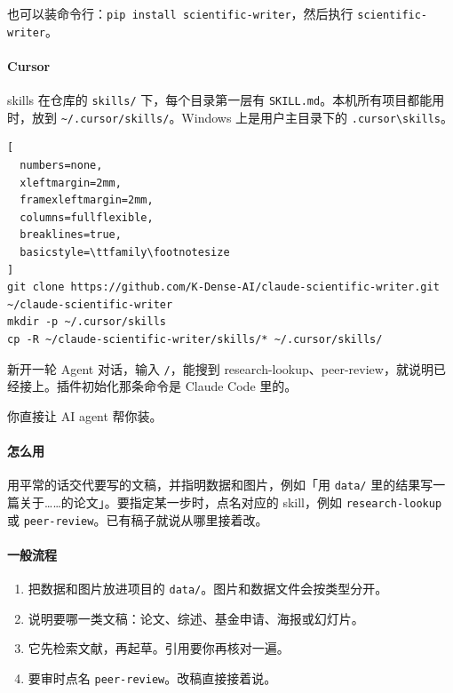 也可以装命令行：\verb|pip install scientific-writer|，然后执行 \verb|scientific-writer|。

\paragraph{Cursor}
skills 在仓库的 \verb|skills/| 下，每个目录第一层有 \verb|SKILL.md|。本机所有项目都能用时，放到 \verb|~/.cursor/skills/|。Windows 上是用户主目录下的 \verb|.cursor\skills|。
\begin{lstlisting}[
  numbers=none,
  xleftmargin=2mm,
  framexleftmargin=2mm,
  columns=fullflexible,
  breaklines=true,
  basicstyle=\ttfamily\footnotesize
]
git clone https://github.com/K-Dense-AI/claude-scientific-writer.git ~/claude-scientific-writer
mkdir -p ~/.cursor/skills
cp -R ~/claude-scientific-writer/skills/* ~/.cursor/skills/
\end{lstlisting}
新开一轮 Agent 对话，输入 \verb|/|，能搜到 research-lookup、peer-review，就说明已经接上。插件初始化那条命令是 Claude Code 里的。

\begin{xiaonao}
你直接让 AI agent 帮你装。
\end{xiaonao}

\paragraph{怎么用}
用平常的话交代要写的文稿，并指明数据和图片，例如「用 \verb|data/| 里的结果写一篇关于……的论文」。要指定某一步时，点名对应的 skill，例如 \verb|research-lookup| 或 \verb|peer-review|。已有稿子就说从哪里接着改。

\paragraph{一般流程}
\begin{enumerate}
\item 把数据和图片放进项目的 \verb|data/|。图片和数据文件会按类型分开。
\item 说明要哪一类文稿：论文、综述、基金申请、海报或幻灯片。
\item 它先检索文献，再起草。引用要你再核对一遍。
\item 要审时点名 \verb|peer-review|。改稿直接接着说。
\end{enumerate}


